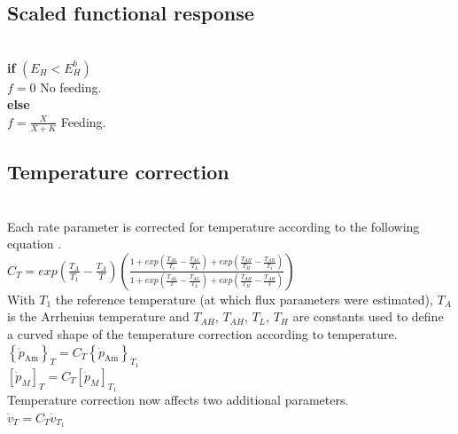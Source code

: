 \subsection*{Scaled functional response}
\hfill \\

\textbf{if} $(E_{H} < E_{H}^b)$\\

$f = 0$				\hfill No feeding.\\

\textbf{else}\\

$f= \frac{X}{X+K}$	\hfill Feeding.\\

\subsection*{Temperature correction}
\hfill \\

Each rate parameter is corrected for temperature according to the following equation \citep{Kooi2009}.\\

$
	C_{T} = exp\left ( \frac{T_{A}}{T_{1}} - \frac{T_{A}}{T} \right )
	\left ( \frac
				{1+exp\left ( \frac{T_{AL}}{T_{1}} - \frac{T_{AL}}{T_{L}} \right )
				  +exp\left ( \frac{T_{AH}}{T_{H}} - \frac{T_{AH}}{T_{1}} \right )}
				{1+exp\left ( \frac{T_{AL}}{T} - \frac{T_{AL}}{T_{L}} \right )
				  +exp\left ( \frac{T_{AH}}{T_{H}} - \frac{T_{AH}}{T} \right )}
	\right )
$\\

With $T_{1}$ the reference temperature (at which flux parameters were estimated), $T_{A}$ is the Arrhenius temperature and $T_{AH}$, $T_{AH}$, $T_{L}$, $T_{H}$ are constants used to define a curved shape of the temperature correction according to temperature.\\

$\left \{ \dot{p}_\mathrm{Am} \right \}_{T} = C_{T} \left \{ \dot{p}_\mathrm{Am} \right \}_{T_{1}}$\\

$\left [ \dot{p}_{M} \right ]_{T} = C_{T} \left [ \dot{p}_{M} \right ]_{T_{1}}$\\


Temperature correction now affects two additional parameters.\\

$\dot{v}_{T} = C_{T} \dot{v}_{T_{1}}$\\

